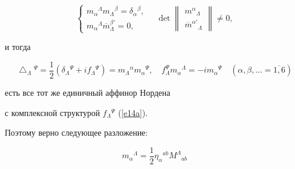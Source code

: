 \begin{equation}


\label{e17a}


\begin{cases}


m_\alpha{}^\Lambda m_\Lambda{^\beta} = \delta_\alpha{}^\beta,\\


m_\alpha{}^\Lambda \overline m_\Lambda^{\beta'} = 0,


\end{cases}


\quad


\det


\begin{Vmatrix}


m^\alpha{}_\Lambda \\


\overline m^{\alpha '}{}_\Lambda


\end{Vmatrix}


\ne 0,


\end{equation}


и тогда


\begin{equation}


\label{e18a}


\bigtriangleup_\Lambda{}^\Psi=\frac{1}{2}


(\delta_\Lambda{}^\Psi+if_\Lambda{}^\Psi)=


m_\Lambda{^\alpha} m_\alpha{}^\Psi,\quad


f_\Lambda^\Psi m_\alpha{}^\Lambda=-im_\alpha{}^\Psi\quad


(\alpha,\beta,\dotsc=\overline{1,6})


\end{equation}


есть все тот же единичный аффинор Нордена \cite{6}


с комплексной структурой $f_\Lambda{}^\Psi$ (\ref{e14a}).


Поэтому верно следующее разложение:


\begin{equation}


\label{e20a}


m_\alpha{}^\Lambda=\frac{1}{2}\eta_\alpha{}^{ab}


M^\Lambda{}_{ab}


\end{equation}


